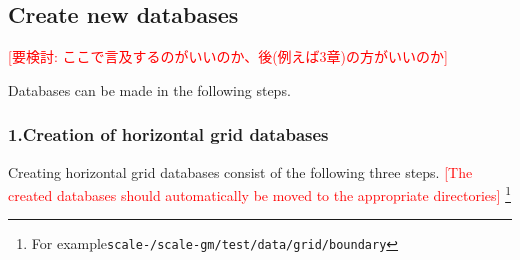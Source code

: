 \subsection{Create new databases}
\textcolor{red}{[要検討: ここで言及するのがいいのか、後(例えば3章)の方がいいのか]}

Databases can be made in the following steps.
\subsubsection{1.Creation of horizontal grid databases}
Creating horizontal grid databases consist of the following three steps.
\textcolor{red}{[The created databases should automatically be moved to the appropriate directories]}
\footnote{For example\texttt{scale-{\version}/scale-gm/test/data/grid/boundary}}
\renewcommand{\labelenumi}{(\roman{enumi})}
